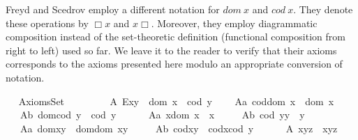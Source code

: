 \begin{isabellebody}
\begin{isamarkuptext}
     Freyd and Scedrov employ a different notation for $dom\ x$ and $cod\ 
     x$. They denote these operations by $\Box x$ 
     and $x\Box$. Moreover, they employ diagrammatic composition instead of the set-theoretic 
     definition (functional composition from right to left) used so 
     far.
     We leave it to the reader to verify that their axioms corresponds to the axioms presented
     here modulo an appropriate conversion of notation.%
\end{isamarkuptext}\isamarkuptrue%
\ \isamarkupfalse%
\ AxiomsSet{}\ {\isacharequal}\ \isanewline
\ \ \isanewline
\ \ \ \ A{}{\isacharcolon}\ {\isachardoublequoteopen}E{\isacharparenleft}x{\isasymcdot}y{\isacharparenright}\ \isactrlbold {\isasymleftrightarrow}\ dom\ x\ {\isasymsimeq}\ cod\ y{\isachardoublequoteclose}\ \isanewline
\ \ \ A{}a{\isacharcolon}\ {\isachardoublequoteopen}cod{\isacharparenleft}dom\ x{\isacharparenright}\ {\isasymcong}\ dom\ x{\isachardoublequoteclose}\ \ \ \isanewline
\ \ \ A{\isadigit{2}}b{\isacharcolon}\ {\isachardoublequoteopen}dom{\isacharparenleft}cod\ y{\isacharparenright}\ {\isasymcong}\ cod\ y{\isachardoublequoteclose}\ \ \ \isanewline
\ \ \ A{}a{\isacharcolon}\ {\isachardoublequoteopen}x{\isasymcdot}{\isacharparenleft}dom\ x{\isacharparenright}\ {\isasymcong}\ x{\isachardoublequoteclose}\ \ \isanewline
\ \ \ A{\isadigit{3}}b{\isacharcolon}\ {\isachardoublequoteopen}{\isacharparenleft}cod\ y{\isacharparenright}{\isasymcdot}y\ {\isasymcong}\ y{\isachardoublequoteclose}\ \isakeyword{and}\ \isanewline
\ \ \ A{}a{\isacharcolon}\ {\isachardoublequoteopen}dom{\isacharparenleft}x{\isasymcdot}y{\isacharparenright}\ {\isasymcong}\ dom{\isacharparenleft}{\isacharparenleft}dom\ x{\isacharparenright}{\isasymcdot}y{\isacharparenright}{\isachardoublequoteclose}\ \ \isanewline
\ \ \ A{\isadigit{4}}b{\isacharcolon}\ {\isachardoublequoteopen}cod{\isacharparenleft}x{\isasymcdot}y{\isacharparenright}\ {\isasymcong}\ cod{\isacharparenleft}x{\isasymcdot}{\isacharparenleft}cod\ y{\isacharparenright}{\isacharparenright}{\isachardoublequoteclose}\ \isakeyword{and}\ \isanewline
\ \ \ \ A{\isadigit{5}}{\isacharcolon}\ {\isachardoublequoteopen}x{\isasymcdot}{\isacharparenleft}y{\isasymcdot}z{\isacharparenright}\ {\isasymcong}\ {\isacharparenleft}x{\isasymcdot}y{\isacharparenright}{\isasymcdot}z{\isachardoublequoteclose}\ \ \isanewline
\ \ \isakeyword{begin}\isanewline
\ \ \ \isamarkupfalse%

\end{isabellebody}
